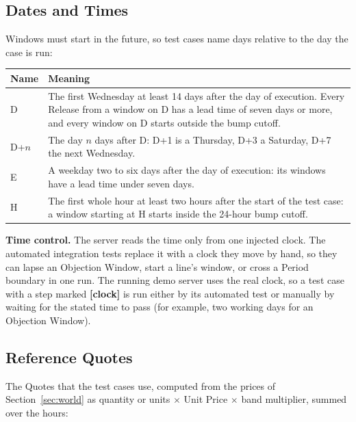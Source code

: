 \subsection{Dates and Times}\label{sec:dates}\label{sec:time}
Windows must start in the future, so test cases name days relative to the day the case is run:

\begin{tabularx}{\textwidth}{@{}L{2.2cm}Y@{}}
\toprule
\textbf{Name} & \textbf{Meaning} \\
\midrule
D & The first Wednesday at least 14 days after the day of execution. Every Release from a window on D has a lead time of seven days or more, and every window on D starts outside the bump cutoff. \\
D+$n$ & The day $n$ days after D: D+1 is a Thursday, D+3 a Saturday, D+7 the next Wednesday. \\
E & A weekday two to six days after the day of execution: its windows have a lead time under seven days. \\
H & The first whole hour at least two hours after the start of the test case: a window starting at H starts inside the 24-hour bump cutoff. \\
\bottomrule
\end{tabularx}

\textbf{Time control.} The server reads the time only from one injected clock. The automated integration tests replace it with a clock they move by hand, so they can lapse an Objection Window, start a line's window, or cross a Period boundary in one run. The running demo server uses the real clock, so a test case with a step marked \textbf{[clock]} is run either by its automated test or manually by waiting for the stated time to pass (for example, two working days for an Objection Window).

\subsection{Reference Quotes}\label{sec:quotes}
The Quotes that the test cases use, computed from the prices of Section~\ref{sec:world} as quantity or units $\times$ Unit Price $\times$ band multiplier, summed over the hours:

